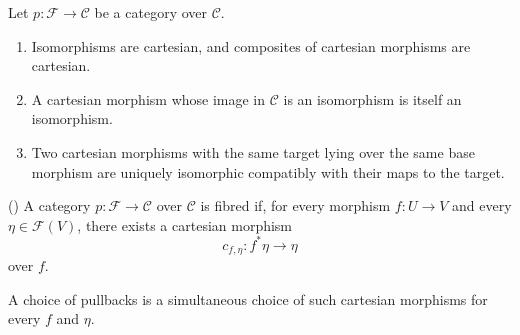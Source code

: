 \begin{proposition}
	\label{prop:cartesian-properties}
	\cite[][02XJ]{stacks-project}
	Let $p:\mathcal{F}\to\mathcal{C}$ be a category over
	$\mathcal{C}$.
	\begin{enumerate}
		\item
		Isomorphisms are cartesian, and composites of
		cartesian morphisms are cartesian.
		
		\item
		A cartesian morphism whose image in $\mathcal{C}$
		is an isomorphism is itself an isomorphism.
		
		\item
		Two cartesian morphisms with the same target
		lying over the same base morphism are uniquely
		isomorphic compatibly with their maps to the
		target.
	\end{enumerate}
\end{proposition}

\begin{definition}
	\label{def:fibred-category}
	(\cite[][Tag 02XM and 02XN]{stacks-project})
	A category $p:\mathcal{F}\to\mathcal{C}$ over $\mathcal{C}$ is
	fibred if, for every morphism $f:U\to V$
	and every $\eta\in\mathcal{F}(V)$, there exists a
	cartesian morphism
	\[
	c_{f,\eta}:f^*\eta\longrightarrow\eta
	\]
	over $f$.
	
	A choice of pullbacks is a simultaneous choice
	of such cartesian morphisms for every $f$ and $\eta$.
\end{definition}


